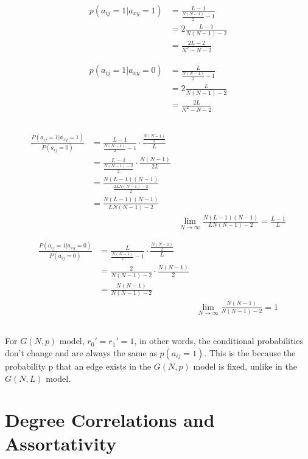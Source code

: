 \documentclass {article}
\begin{document}
\begin{align*}	
	p(a_{ij} = 1 | a_{xy} = 1) &= \frac{ L-1 }{ \frac{ N(N-1) }{ 2 } - 1 } \\
	&= 2 \frac{ L-1 }{ N(N-1) - 2 } \\
	&= \frac{ 2L-2 }{ N^2-N-2 }
\end{align*}

\begin{align*}	
	p(a_{ij} = 1 | a_{xy} = 0) &= \frac{ L }{ \frac{ N(N-1) }{ 2 } - 1 } \\
	&= 2 \frac{ L }{ N(N-1) - 2 } \\
	&= \frac{ 2L }{ N^2-N-2 }
\end{align*}

\subsection{}
\begin{align*}
	\frac{P \left( a_{ij} = 1 | a_{xy} = 1 \right)}{P \left( a_{ij}=0 \right)} &=\frac{L-1}{\frac{N(N-1)}{2}-1} \cdot \frac{\frac{N(N-1)}{2}}{L}\\
	&=\frac{L-1}{\frac{N(N-1)-2}{2}} \cdot \frac{N(N-1)}{2L}\\
	&= \frac{N(L-1)(N-1)}{\frac{2LN(N-1)-2}{2}}\\
	&= \frac{N(L-1)(N-1)}{LN(N-1)-2}\\
	&&\lim\limits_{N \to \infty}  \frac{N(L-1)(N-1)}{LN(N-1)-2} = \frac{L-1}{L}
\end{align*}

\begin{align*}
	\frac{P \left( a_{ij} = 1 | a_{xy} = 0 \right)}{P \left( a_{ij}=0 \right)} &=\frac{L}{\frac{N(N-1)}{2}-1} \cdot \frac{\frac{N(N-1)}{2}}{L}\\
	&= \frac{2}{N(N-1)-2} \cdot \frac{N(N-1)}{2}\\
	&= \frac{N(N-1)}{N(N-1)-2}\\
	&&\lim\limits_{N \to \infty} \frac{N(N-1)}{N(N-1)-2} = 1
\end{align*}

\subsection{}
For $G(N,p)$ model, $r_0' = r_1' = 1$, in other words, the conditional probabilities don't change and are always the same as $p(a_{ij} = 1)$. This is the because the probability p that an edge exists in the $G(N,p)$ model is fixed, unlike in the $G(N,L)$ model.

\subsection{}


\newpage




\section{Degree Correlations and Assortativity}
\end{document}
